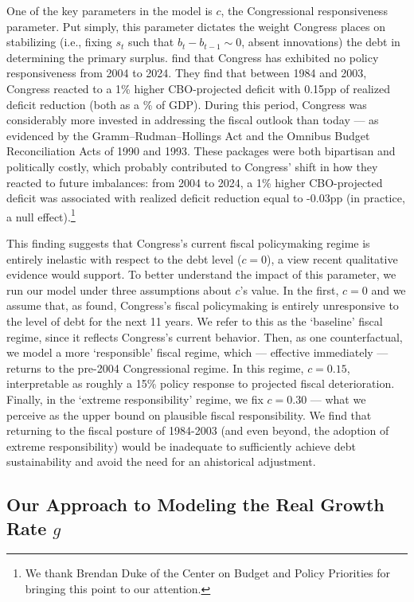 \documentclass[12pt]{article}
\begin{document}
One of the key parameters in the model is $c$, the Congressional responsiveness parameter. Put simply, this parameter dictates the weight Congress places on stabilizing (i.e., fixing $s_t$ such that $b_{t} - b_{t-1} \sim 0$, absent innovations) the debt in determining the primary surplus. \textcite{auerbach2025robust} find that Congress has exhibited no policy responsiveness from 2004 to 2024. They find that between 1984 and 2003, Congress reacted to a 1\% higher CBO-projected deficit with 0.15pp of realized deficit reduction (both as a \% of GDP). During this period, Congress was considerably more invested in addressing the fiscal outlook than today --- as evidenced by the Gramm–Rudman–Hollings Act and the Omnibus Budget Reconciliation Acts of 1990 and 1993. These packages were both bipartisan and politically costly, which probably contributed to Congress' shift in how they reacted to future imbalances: from 2004 to 2024, a 1\% higher CBO-projected deficit was associated with realized deficit reduction equal to -0.03pp (in practice, a null effect).\footnote{We thank Brendan Duke of the Center on Budget and Policy Priorities for bringing this point to our attention.}

This finding suggests that Congress's current fiscal policymaking regime is entirely inelastic with respect to the debt level ($c = 0$), a view recent qualitative evidence would support. To better understand the impact of this parameter, we run our model under three assumptions about $c$'s value. In the first, $c = 0$ and we assume that, as \textcite{auerbach2025robust} found, Congress's fiscal policymaking is entirely unresponsive to the level of debt for the next 11 years. We refer to this as the `baseline' fiscal regime, since it reflects Congress's current behavior. Then, as one counterfactual, we model a more `responsible' fiscal regime, which --- effective immediately --- returns to the pre-2004 Congressional regime. In this regime, $c = 0.15$, interpretable as roughly a 15\% policy response to projected fiscal deterioration. Finally, in the `extreme responsibility' regime, we fix $c = 0.30$ --- what we perceive as the upper bound on plausible fiscal responsibility. We find that returning to the fiscal posture of 1984-2003 (and even beyond, the adoption of extreme responsibility) would be inadequate to sufficiently achieve debt sustainability and avoid the need for an ahistorical adjustment.

\subsection{Our Approach to Modeling the Real Growth Rate $g$}
\end{document}
